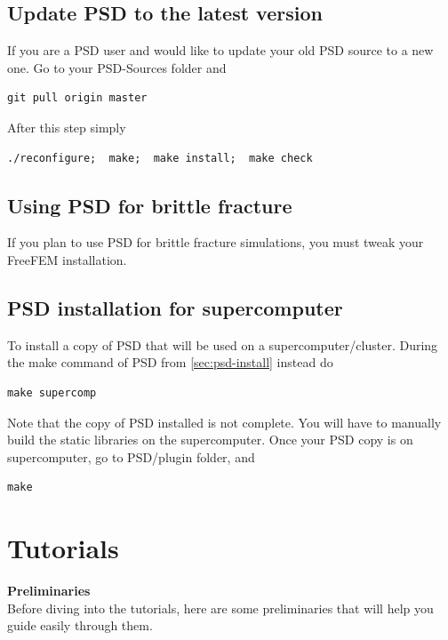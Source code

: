 \documentclass{report}
\begin{document}
\section{Update PSD to the latest version}

If you are a PSD user and would like to update your old PSD source to a new one. Go to your {\ttfamily PSD-Sources} folder and

\begin{lstlisting}[style=Linux]
git pull origin master
\end{lstlisting}

After this step simply

\begin{lstlisting}[style=Linux]
./reconfigure;  make;  make install;  make check
\end{lstlisting}

\section{Using PSD for brittle fracture}

If you plan to use PSD for brittle fracture simulations, you must tweak your FreeFEM installation.

\section{PSD installation for supercomputer}

To install a copy of PSD that will be used on a supercomputer/cluster. During the  {\ttfamily make} command of PSD from \cref{sec:psd-install} instead do 

\begin{lstlisting}[style=Linux]
make supercomp
\end{lstlisting}

Note that the copy of PSD installed is not complete. You will have to manually build the static libraries on the supercomputer. Once your PSD copy is on supercomputer, go to  {\ttfamily PSD/plugin} folder, and 
\begin{lstlisting}[style=Linux]
make
\end{lstlisting}





\chapter{Tutorials}

\textbf{Preliminaries}\\
Before diving into the tutorials, here are some preliminaries that will help you guide easily through them.
\end{document}
